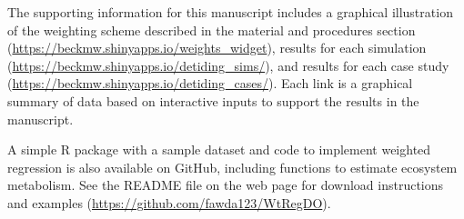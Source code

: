 The supporting information for this manuscript includes a graphical illustration of the weighting scheme described in the material and procedures section (\href{https://beckmw.shinyapps.io/weights_widget}{https://beckmw.shinyapps.io/weights\_widget}), results for each simulation (\href{https://beckmw.shinyapps.io/detiding_sims/}{https://beckmw.shinyapps.io/detiding\_sims/}), and results for each case study (\href{https://beckmw.shinyapps.io/detiding_cases/}{https://beckmw.shinyapps.io/detiding\_cases/}).  Each link is a graphical summary of data based on interactive inputs to support the results in the manuscript.

A simple R package with a sample dataset and code to implement weighted regression is also available on GitHub, including functions to estimate ecosystem metabolism.  See the README file on the web page for download instructions and examples (\href{https://github.com/fawda123/WtRegDO}{https://github.com/fawda123/WtRegDO}).